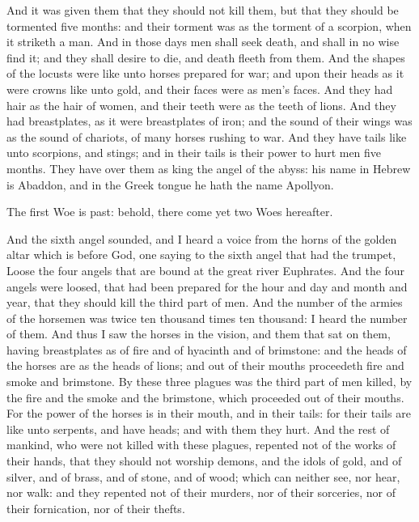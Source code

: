 And it was given them that they should not kill them, but that they should be tormented five months: and their torment was as the torment of a scorpion, when it striketh a man. 
 And in those days men shall seek death, and shall in no wise find it; and they shall desire to die, and death fleeth from them. 
 And the shapes of the locusts were like unto horses prepared for war; and upon their heads as it were crowns like unto gold, and their faces were as men’s faces. 
 And they had hair as the hair of women, and their teeth were as the teeth of lions. 
 And they had breastplates, as it were breastplates of iron; and the sound of their wings was as the sound of chariots, of many horses rushing to war. 
 And they have tails like unto scorpions, and stings; and in their tails is their power to hurt men five months. 
 They have over them as king the angel of the abyss: his name in Hebrew is Abaddon, and in the Greek tongue he hath the name Apollyon.

 The first Woe is past: behold, there come yet two Woes hereafter.

 And the sixth angel sounded, and I heard a voice from the horns of the golden altar which is before God, 
 one saying to the sixth angel that had the trumpet, Loose the four angels that are bound at the great river Euphrates. 
 And the four angels were loosed, that had been prepared for the hour and day and month and year, that they should kill the third part of men. 
 And the number of the armies of the horsemen was twice ten thousand times ten thousand: I heard the number of them. 
 And thus I saw the horses in the vision, and them that sat on them, having breastplates as of fire and of hyacinth and of brimstone: and the heads of the horses are as the heads of lions; and out of their mouths proceedeth fire and smoke and brimstone. 
 By these three plagues was the third part of men killed, by the fire and the smoke and the brimstone, which proceeded out of their mouths. 
 For the power of the horses is in their mouth, and in their tails: for their tails are like unto serpents, and have heads; and with them they hurt. 
 And the rest of mankind, who were not killed with these plagues, repented not of the works of their hands, that they should not worship demons, and the idols of gold, and of silver, and of brass, and of stone, and of wood; which can neither see, nor hear, nor walk: 
 and they repented not of their murders, nor of their sorceries, nor of their fornication, nor of their thefts.